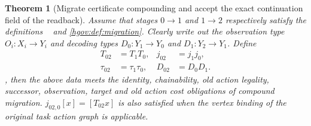 \documentclass[12pt,a4paper,openany,notitlepage]{report}
\theoremstyle{plain}
\newtheorem{theorem}{Theorem}[chapter]
\theoremstyle{definition}
\theoremstyle{remark}
\begin{document}
\begin{CJK*}
\begin{theorem}
[Migrate certificate compounding and accept the exact continuation field of the readback]\label{exp:gov:migration-composition}
Assume that stages $0\to1$ and $1\to2$ respectively satisfy the definitions ~ and \ref{hgov:def:migration}. Clearly write out the observation type $O_i:X_i\to Y_i$ and decoding types $D_0:Y_1\to Y_0$ and $D_1:Y_2\to Y_1$. Define \[
\begin{aligned}
 T_{02}&=T_1T_0,& j_{02}&=j_1j_0,\\
 \tau_{02}&=\tau_1\tau_0,& D_{02}&=D_0D_1.
\end{aligned}
\], then the above data meets the identity, chainability, old action legality, successor, observation, target and old action cost obligations of compound migration. $j_{02,0}[x]=[T_{02}x]$ is also satisfied when the vertex binding of the original task action graph is applicable.


\end{theorem}
\end{CJK*}
\end{document}
